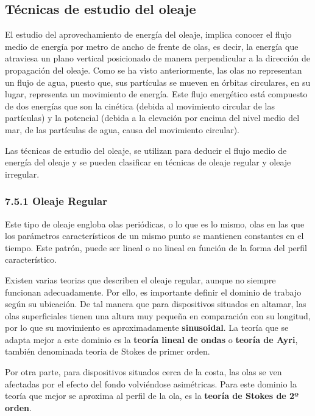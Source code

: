 \subsection{Técnicas de estudio del oleaje}\label{header-n151}

El estudio del aprovechamiento de energía del oleaje, implica conocer el
flujo medio de energía por metro de ancho de frente de olas, es decir,
la energía que atraviesa un plano vertical posicionado de manera
perpendicular a la dirección de propagación del oleaje. Como se ha visto
anteriormente, las olas no representan un flujo de agua, puesto que, sus
partículas se mueven en órbitas circulares, en su lugar, representa un
movimiento de energía. Este flujo energético está compuesto de dos
energías que son la cinética (debida al movimiento circular de las
partículas) y la potencial (debida a la elevación por encima del nivel
medio del mar, de las partículas de agua, causa del movimiento
circular).

Las técnicas de estudio del oleaje, se utilizan para deducir el flujo
medio de energía del oleaje y se pueden clasificar en técnicas de oleaje
regular y oleaje irregular.

\subsubsection{7.5.1 Oleaje Regular}\label{header-n156}

Este tipo de oleaje engloba olas periódicas, o lo que es lo mismo, olas
en las que los parámetros característicos de un mismo punto se mantienen
constantes en el tiempo. Este patrón, puede ser lineal o no lineal en
función de la forma del perfil característico.

Existen varias teorias que describen el oleaje regular, aunque no
siempre funcionan adecuadamente. Por ello, es importante definir el
dominio de trabajo según su ubicación. De tal manera que para
dispositivos situados en altamar, las olas superficiales tienen una
altura muy pequeña en comparación con su longitud, por lo que su
movimiento es aproximadamente \textbf{sinusoidal}. La teoría que se
adapta mejor a este dominio es la \textbf{teoría lineal de ondas} o
\textbf{teoría de Ayri}, también denominada teoria de Stokes de primer
orden.

Por otra parte, para dispositivos situados cerca de la costa, las olas
se ven afectadas por el efecto del fondo volviéndose asimétricas. Para
este dominio la teoría que mejor se aproxima al perfil de la ola, es la
\textbf{teoría de Stokes de 2º orden}.

